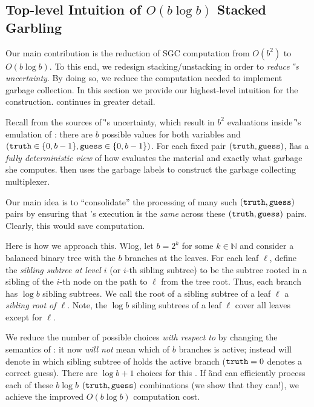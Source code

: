 
\subsection{Top-level Intuition of $O(b \log b)$ Stacked Garbling}
\label{sec:intuition}

Our main contribution is the reduction of SGC computation from
$O(b^2)$ to $O(b \log b)$.  To this end, we redesign
stacking/unstacking in order to \emph{reduce \G's
uncertainty}.
%
By doing so, we reduce the computation needed to implement garbage
collection.
%
In this section we provide our highest-level intuition for the
construction.  continues in greater detail.

Recall from  the  sources of \G's
uncertainty, which result in $b^2$ evaluations inside \G's emulation
of \E: there are $b$ possible values for both variables \truth and \guess
$(\mathtt{truth} \in\{0,b-1\}, \mathtt{guess}\in\{0,b-1\})$.
%
For each fixed pair  $(\mathtt{truth},\mathtt{guess})$, \G has a {\em fully
deterministic view} of how \E evaluates the material and exactly
what garbage she computes. 
\G then uses the
garbage labels to construct the garbage collecting multiplexer.

Our main idea is to ``consolidate'' the processing of many
such $(\mathtt{truth},\mathtt{guess})$ pairs by ensuring that \E's execution is the {\em
same} across these $(\mathtt{truth},\mathtt{guess})$ pairs.  Clearly, this would
save computation.

Here is how we approach this.
Wlog, let $b = 2^k$ for some $k \in \mathbb{N}$ and consider a balanced
binary tree with the $b$ branches at the leaves.
For each leaf $\ell$, define the {\em sibling subtree at level $i$} (or
$i$-th  sibling subtree) to be the subtree rooted in a sibling of the
$i$-th node on the path to $\ell$ from the tree root.  Thus, each branch
has $\log b$ sibling subtrees.
We call the root of a
sibling subtree of a leaf $\ell$ a {\em sibling root of $\ell$}.
Note, the $\log b$ sibling subtrees of a leaf $\ell$ 
cover all leaves except for $\ell$.

We reduce the number of possible \truth choices  {\em with respect to
\guess}  by changing the semantics of \truth: it
now \emph{will not} mean which of $b$ branches is active; instead \truth
will denote in which sibling subtree of \guess holds the active branch
($\mathtt{truth}=0$ denotes a correct guess).  There are $\log b + 1$
choices for this \truth.  If \G and \E can efficiently process each
of these $b\log b$  $(\mathtt{truth},\mathtt{guess})$ combinations  (we show that they
can!), we achieve the improved $O(b\log b)$ computation cost.
